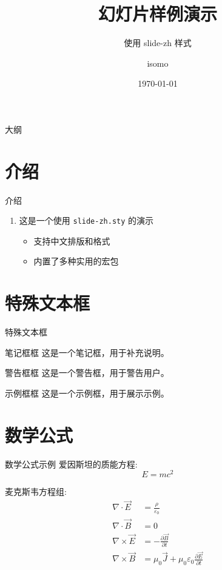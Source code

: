 \documentclass{beamer}
\title{幻灯片样例演示}
\subtitle{使用 slide-zh 样式}
\author{isomo}
\date{\today}
\begin{document}
\begin{frame}
  \titlepage
\end{frame}

\begin{frame}{大纲}
  \tableofcontents
\end{frame}

\section{介绍}
\begin{frame}{介绍}
  \begin{enumerate}
    \item 这是一个使用 \texttt{slide-zh.sty} 的演示
      \begin{itemize}
        \item 支持中文排版和格式
        \item 内置了多种实用的宏包
      \end{itemize}
  \end{enumerate}
\end{frame}

\section{特殊文本框}
\begin{frame}{特殊文本框}
  \begin{block}{笔记框框}
    这是一个笔记框，用于补充说明。
  \end{block}
  \begin{alertblock}{警告框框}
    这是一个警告框，用于警告用户。
  \end{alertblock}
  \begin{exampleblock}{示例框框}
    这是一个示例框，用于展示示例。
  \end{exampleblock}
\end{frame}

\section{数学公式}
\begin{frame}{数学公式示例}
  爱因斯坦的质能方程:
  \begin{equation}
    E = mc^2
  \end{equation}

  麦克斯韦方程组:
  \begin{align}
    \nabla \cdot \vec{E} &= \frac{\rho}{\varepsilon_0} \\
    \nabla \cdot \vec{B} &= 0 \\
    \nabla \times \vec{E} &= -\frac{\partial \vec{B}}{\partial t} \\
    \nabla \times \vec{B} &= \mu_0\vec{J} + \mu_0\varepsilon_0\frac{\partial \vec{E}}{\partial t}
  \end{align}
\end{frame}
\end{document}
